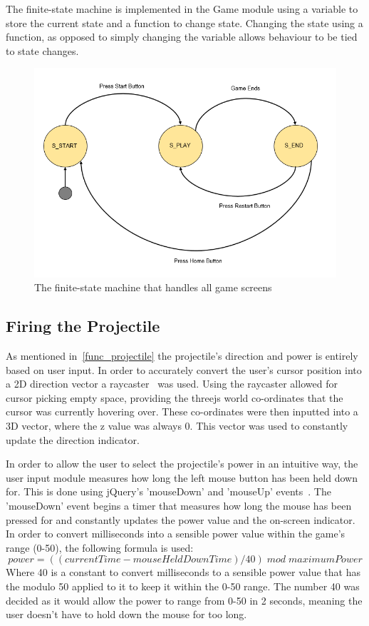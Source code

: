 \documentclass[runningheads]{llncs}
\begin{document}
	The finite-state machine is implemented in the Game module using a variable to store the current state and a function to change state. Changing the state using a function, as opposed to simply changing the variable allows behaviour to be tied to state changes.
	\newpage
	\begin{figure}
		\centering
		\includegraphics[width=\textwidth]{./img/fsm.png}
		\caption{The finite-state machine that handles all game screens}
		\label{fsm}
	\end{figure}
	\subsection{Firing the Projectile}
	As mentioned in~\ref{func_projectile} the projectile's direction and power is entirely based on user input. In order to accurately convert the user's cursor position into a 2D direction vector a raycaster~\cite{ref_raycast} was used. Using the raycaster allowed for cursor picking empty space, providing the threejs world co-ordinates that the cursor was currently hovering over. These co-ordinates were then inputted into a 3D vector, where the z value was always 0. This vector was used to constantly update the direction indicator.
	
	In order to allow the user to select the projectile's power in an intuitive way, the user input module measures how long the left mouse button has been held down for. This is done using jQuery's 'mouseDown' and 'mouseUp' events~\cite{ref_jquery-events}. The 'mouseDown' event begins a timer that measures how long the mouse has been pressed for and constantly updates the power value and the on-screen indicator. In order to convert milliseconds into a sensible power value within the game's range (0-50), the following formula is used:
	\begin{equation}
		power = ((currentTime - mouseHeldDownTime) / 40) \; mod \; maximumPower
	\end{equation}
	Where 40 is a constant to convert milliseconds to a sensible power value that has the modulo 50 applied to it to keep it within the 0-50 range. The number 40 was decided as it would allow the power to range from 0-50 in 2 seconds, meaning the user doesn't have to hold down the mouse for too long.
	
\end{document}

